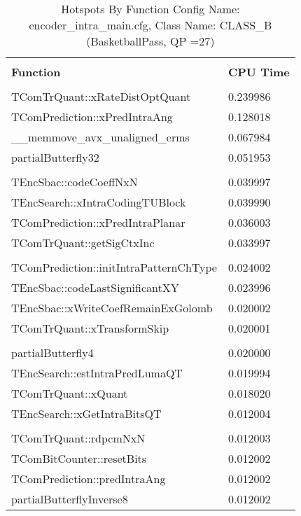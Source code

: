 \documentclass{article}%
\begin{document}
\begin{longtabu}{| X[l] | X[l] |}%
\caption{%
Hotspots By Function\newline%
 Config Name: encoder\_intra\_main.cfg,\newline%
 Class Name: CLASS\_B\newline%
 (BasketballPass, QP =27)%
}%
\hline%
&\\%
\textbf{Function}&\textbf{CPU Time}\\%
&\\%
\hline%
\endhead%
TComTrQuant::xRateDistOptQuant&0.239986\\%
\hline%
TComPrediction::xPredIntraAng&0.128018\\%
\hline%
\_\_memmove\_avx\_unaligned\_erms&0.067984\\%
\hline%
partialButterfly32&0.051953\\%
\hline%
&\\%
\hline%
TEncSbac::codeCoeffNxN&0.039997\\%
\hline%
TEncSearch::xIntraCodingTUBlock&0.039990\\%
\hline%
TComPrediction::xPredIntraPlanar&0.036003\\%
\hline%
TComTrQuant::getSigCtxInc&0.033997\\%
\hline%
&\\%
\hline%
TComPrediction::initIntraPatternChType&0.024002\\%
\hline%
TEncSbac::codeLastSignificantXY&0.023996\\%
\hline%
TEncSbac::xWriteCoefRemainExGolomb&0.020002\\%
\hline%
TComTrQuant::xTransformSkip&0.020001\\%
\hline%
&\\%
\hline%
partialButterfly4&0.020000\\%
\hline%
TEncSearch::estIntraPredLumaQT&0.019994\\%
\hline%
TComTrQuant::xQuant&0.018020\\%
\hline%
TEncSearch::xGetIntraBitsQT&0.012004\\%
\hline%
&\\%
\hline%
TComTrQuant::rdpcmNxN&0.012003\\%
\hline%
TComBitCounter::resetBits&0.012002\\%
\hline%
TComPrediction::predIntraAng&0.012002\\%
\hline%
partialButterflyInverse8&0.012002\\%
\hline%
\end{longtabu}%
\newpage%
\end{document}
